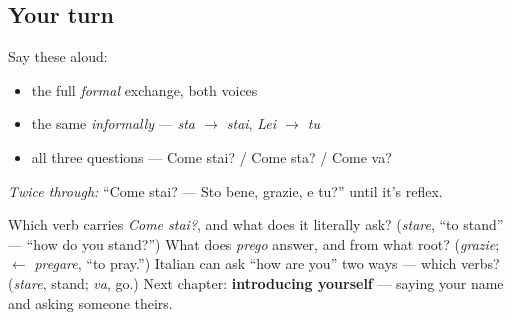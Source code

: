 \subsection*{Your turn}
Say these aloud:

\begin{itemize}
\raggedright
  \item the full \emph{formal} exchange, both voices
  \item the same \emph{informally} — \emph{sta $\to$ stai}, \emph{Lei $\to$ tu}
  \item all three questions — Come stai? / Come sta? / Come va?
\end{itemize}

\emph{Twice through:} \textquotedblleft{}Come stai? — Sto bene, grazie, e tu?\textquotedblright{} until it's reflex.

\begin{tcolorbox}[breakable,colback=teal!4,colframe=teal!35!black,title={Before you move on}]
Which verb carries \emph{Come stai?}, and what does it literally ask? (\emph{stare}, \textquotedblleft{}to stand\textquotedblright{} — \textquotedblleft{}how do you stand?\textquotedblright{}) What does \emph{prego} answer, and from what root? (\emph{grazie}; $\leftarrow$ \emph{pregare}, \textquotedblleft{}to pray.\textquotedblright{}) Italian can ask \textquotedblleft{}how are you\textquotedblright{} two ways — which verbs? (\emph{stare}, stand; \emph{va}, go.) Next chapter: \textbf{introducing yourself} — saying your name and asking someone theirs.
\end{tcolorbox}
